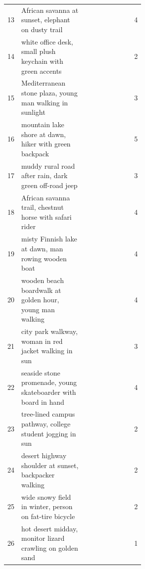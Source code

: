 \documentclass{llmxive}
\providecommand{\cmark}{\ding{51}}
\providecommand{\xmark}{\ding{55}}
\begin{document}
\begin{table}[!htbp]
\begin{tabular}{@{}l p{0.55\linewidth} ccccccc c@{}}
13  & African savanna at sunset, elephant on dusty trail                    & \cmark & \xmark & \cmark & \xmark & \cmark & \cmark & \xmark & 4 \\
14  & white office desk, small plush keychain with green accents            & \xmark & \cmark & \xmark & \cmark & \xmark & \xmark & \xmark & 2 \\
15  & Mediterranean stone plaza, young man walking in sunlight              & \xmark & \cmark & \xmark & \xmark & \xmark & \cmark & \cmark & 3 \\
16  & mountain lake shore at dawn, hiker with green backpack                & \cmark & \cmark & \cmark & \xmark & \xmark & \cmark & \cmark & 5 \\
17  & muddy rural road after rain, dark green off-road jeep                 & \cmark & \xmark & \cmark & \xmark & \xmark & \cmark & \xmark & 3 \\
18  & African savanna trail, chestnut horse with safari rider               & \xmark & \cmark & \cmark & \xmark & \cmark & \xmark & \cmark & 4 \\
19  & misty Finnish lake at dawn, man rowing wooden boat                    & \cmark & \cmark & \xmark & \xmark & \xmark & \cmark & \cmark & 4 \\
20  & wooden beach boardwalk at golden hour, young man walking              & \cmark & \xmark & \xmark & \xmark & \cmark & \cmark & \cmark & 4 \\
21  & city park walkway, woman in red jacket walking in sun                 & \xmark & \cmark & \xmark & \xmark & \xmark & \cmark & \cmark & 3 \\
22  & seaside stone promenade, young skateboarder with board in hand        & \cmark & \cmark & \xmark & \xmark & \xmark & \cmark & \cmark & 4 \\
23  & tree-lined campus pathway, college student jogging in sun             & \xmark & \cmark & \xmark & \xmark & \xmark & \xmark & \cmark & 2 \\
24  & desert highway shoulder at sunset, backpacker walking                 & \xmark & \xmark & \cmark & \xmark & \xmark & \xmark & \cmark & 2 \\
25  & wide snowy field in winter, person on fat-tire bicycle                & \xmark & \xmark & \cmark & \xmark & \xmark & \xmark & \cmark & 2 \\
26  & hot desert midday, monitor lizard crawling on golden sand             & \xmark & \xmark & \cmark & \xmark & \xmark & \xmark & \xmark & 1 \\

\end{tabular}
\end{table}
\end{document}
